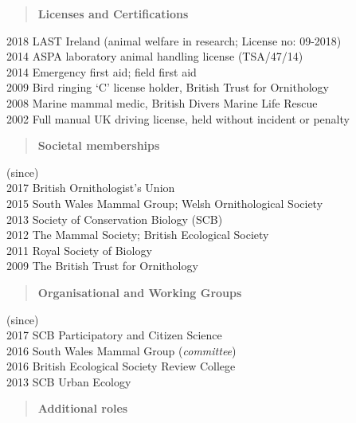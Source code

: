 \documentclass[]{article}
\begin{document}
\begin{quote}
\textbf{Licenses and Certifications}
\end{quote}

2018 LAST Ireland (animal welfare in research; License no: 09-2018)\\
2014 ASPA laboratory animal handling license (TSA/47/14)\\
2014 Emergency first aid; field first aid\\
2009 Bird ringing `C' license holder, British Trust for Ornithology\\
2008 Marine mammal medic, British Divers Marine Life Rescue\\
2002 Full manual UK driving license, held without incident or penalty

\begin{quote}
\textbf{Societal memberships}
\end{quote}

(since)\\
2017 British Ornithologist's Union\\
2015 South Wales Mammal Group; Welsh Ornithological Society\\
2013 Society of Conservation Biology (SCB)\\
2012 The Mammal Society; British Ecological Society\\
2011 Royal Society of Biology\\
2009 The British Trust for Ornithology

\begin{quote}
\textbf{Organisational and Working Groups}
\end{quote}

(since)\\
2017 SCB Participatory and Citizen Science\\
2016 South Wales Mammal Group (\emph{committee})\\
2016 British Ecological Society Review College\\
2013 SCB Urban Ecology

\begin{quote}
\textbf{Additional roles}
\end{quote}
\end{document}
